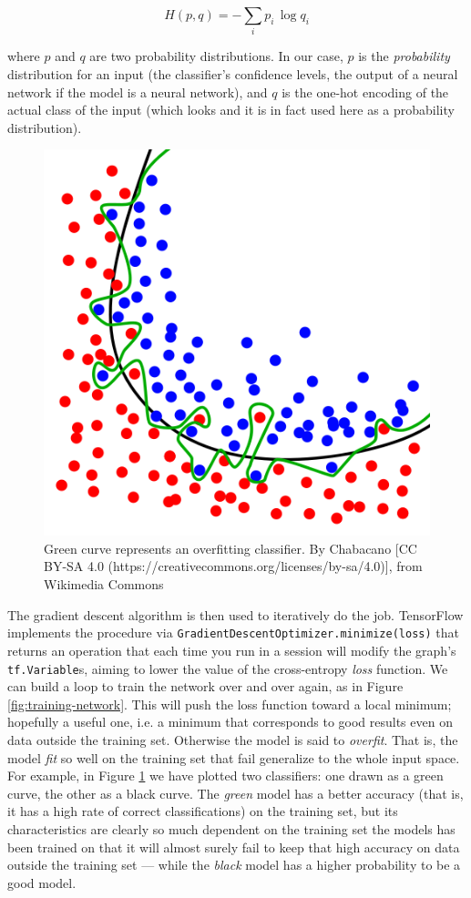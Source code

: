 \[ H(p, q) = - \sum_i {p_i \, \log{q_i}} \]

where $p$ and $q$ are two probability distributions. In our case, $p$
is the \emph{probability} distribution for an input (the classifier's
confidence levels, the output of a neural network if the model is a
neural network), and $q$ is the one-hot encoding of the actual class of
the input (which looks and it is in fact used here as a probability
distribution).

\begin{figure}
  \centering
  \includegraphics[width=0.5\linewidth]{Images/wikipedia-overfitting.png}
  \caption{Green curve represents an overfitting classifier. By
    Chabacano [CC BY-SA 4.0
      (https://creativecommons.org/licenses/by-sa/4.0)], from Wikimedia
    Commons}
  \label{fig:wikipedia-overfitting}
\end{figure}

The gradient descent algorithm is then used to iteratively do the job.
TensorFlow implements the procedure via
\texttt{GradientDescentOptimizer.minimize(loss)} that returns an
operation that each time you run in a session will modify the graph's
\texttt{tf.Variable}s, aiming to lower the value of the cross-entropy
\emph{loss} function. We can build a loop to train the network over and
over again, as in Figure \ref{fig:training-network}. This will push the
loss function toward a local minimum; hopefully a useful one, i.e. a
minimum that corresponds to good results even on data outside the
training set. Otherwise the model is said to \emph{overfit}. That is,
the model \emph{fit} so well on the training set that fail generalize
to the whole input space. For example, in Figure
\ref{fig:wikipedia-overfitting} we have plotted two classifiers: one
drawn as a green curve, the other as a black curve. The \emph{green}
model has a better accuracy (that is, it has a high rate of correct
classifications) on the training set, but its characteristics are
clearly so much dependent on the training set the models has been
trained on that
it will almost surely fail to keep that high accuracy on data outside
the training set --- while the \emph{black} model has a higher
probability to be a good model.

